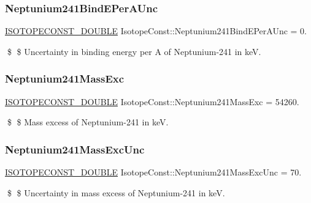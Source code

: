 \subsubsection{\texorpdfstring{Neptunium241\+Bind\+E\+Per\+A\+Unc}{Neptunium241BindEPerAUnc}}
{\footnotesize\ttfamily \mbox{\hyperlink{group___isotope_const-_macros_ga8f45a7272ce02c0b4c65c44636ed719a}{I\+S\+O\+T\+O\+P\+E\+C\+O\+N\+S\+T\+\_\+\+D\+O\+U\+B\+LE}} Isotope\+Const\+::\+Neptunium241\+Bind\+E\+Per\+A\+Unc = 0.}

\$ \$ Uncertainty in binding energy per A of Neptunium-\/241 in keV. \mbox{\label{group___isotope_const-_neptunium-_np241_ga21e8248c64bc2849557d097191fbc126}} 
\subsubsection{\texorpdfstring{Neptunium241\+Mass\+Exc}{Neptunium241MassExc}}
{\footnotesize\ttfamily \mbox{\hyperlink{group___isotope_const-_macros_ga8f45a7272ce02c0b4c65c44636ed719a}{I\+S\+O\+T\+O\+P\+E\+C\+O\+N\+S\+T\+\_\+\+D\+O\+U\+B\+LE}} Isotope\+Const\+::\+Neptunium241\+Mass\+Exc = 54260.}

\$ \$ Mass excess of Neptunium-\/241 in keV. \mbox{\label{group___isotope_const-_neptunium-_np241_gaccfff9d6fbd754a9b61de040ff9cceb4}} 
\subsubsection{\texorpdfstring{Neptunium241\+Mass\+Exc\+Unc}{Neptunium241MassExcUnc}}
{\footnotesize\ttfamily \mbox{\hyperlink{group___isotope_const-_macros_ga8f45a7272ce02c0b4c65c44636ed719a}{I\+S\+O\+T\+O\+P\+E\+C\+O\+N\+S\+T\+\_\+\+D\+O\+U\+B\+LE}} Isotope\+Const\+::\+Neptunium241\+Mass\+Exc\+Unc = 70.}

\$ \$ Uncertainty in mass excess of Neptunium-\/241 in keV. \mbox{\label{group___isotope_const-_neptunium-_np241_ga168c14174ecba925d1b701963e442a9f}} 
